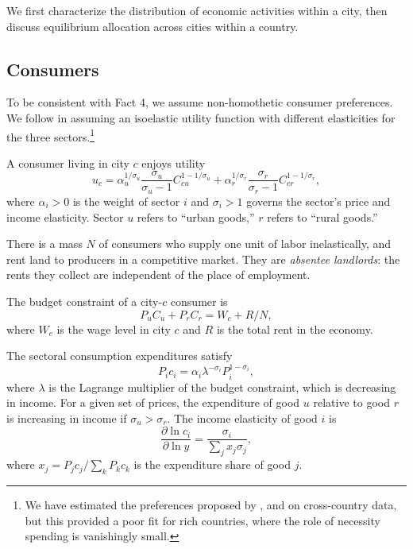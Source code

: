 \documentclass[12pt]{article}
\begin{document}
We first characterize the distribution of economic activities within a city, then discuss equilibrium allocation across cities within a country.

\subsection{Consumers}
To be consistent with Fact 4, we assume non-homothetic consumer preferences. We follow  in assuming an isoelastic utility function with different elasticities for the three sectors.\footnote{We have estimated the preferences proposed by ,  and  on cross-country data, but this provided a poor fit for rich countries, where the role of necessity spending is vanishingly small.}

A consumer living in city $c$ enjoys utility
\begin{equation}
\label{eq:Utility}
u_c = 
\alpha_u^{1/\sigma_u}
	\frac {\sigma_u}
			{\sigma_u-1}
	C_{cu}^{1-1/\sigma_u}
	+
	\alpha_r^{1/\sigma_r}
	\frac {\sigma_r}
			{\sigma_r-1}
	C_{cr}^{1-1/\sigma_r},
\end{equation}
where $\alpha_i>0$ is the weight of sector $i$ and $\sigma_i>1$ governs the sector's price and income elasticity. Sector $u$ refers to ``urban goods,'' $r$ refers to ``rural goods.'' 

There is a mass $N$ of consumers who supply one unit of labor inelastically, and rent land to producers in a competitive market. They are \emph{absentee landlords}: the rents they collect are independent of the place of employment.

The budget constraint of a city-$c$ consumer is
\begin{equation}
\label{eq:BudCons}
P_u C_u + P_r C_r
	= W_c + R/N,
\end{equation}
where $W_c$ is the wage level in city $c$ and $R$ is the total rent in the economy.

The sectoral consumption expenditures satisfy
\begin{equation}\label{eq:ConsShares}
{P_i c_i}
=
\alpha_i
\lambda^{ - \sigma_i}
{ P_i^{1-\sigma_i}},
\end{equation}
where $\lambda$ is the Lagrange multiplier of the budget constraint, which is decreasing in income. For a given set of prices, the expenditure of good $u$ relative to good $r$ is increasing in income if $\sigma_u>\sigma_r$.
The income elasticity of good $i$ is
\begin{equation}\label{eq:income_elasticity}
\frac 	{\partial \ln c_i}
		{\partial \ln y}
=
\frac 	{\sigma_i}
		{\sum_j x_j\sigma_j},
\end{equation}
where $x_j=P_jc_j/\sum_k P_kc_k$ is the expenditure share of good $j$.
\end{document}

